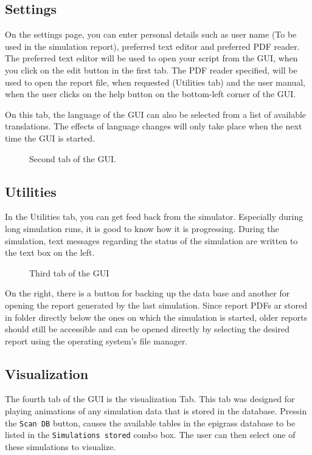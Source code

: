 \subsection{Settings}
On the settings page, you can enter personal details such as user name (To be used in the simulation report), preferred text editor and preferred PDF reader. The preferred text editor will be used to open your script from the GUI, when you click on the edit button in the first tab. The PDF reader specified, will be used to open the report file, when requested (Utilities tab) and the user manual, when the user clicks on the help button on the bottom-left corner of the GUI.

On this tab, the language of the GUI can also be selected from a list of available translations. The effects of language changes will only take place when the next time the GUI is started.
\begin{figure}
	\centering
	\caption{Second tab of the GUI.}
	\label{fig:guiset}
\end{figure}

\subsection{Utilities}
In the Utilities tab, you can get feed back from the simulator. Especially during long simulation runs, it is good to know how it is progressing. During the simulation, text messages regarding the status of the simulation are written to the text box on the left. 
\begin{figure}
	\centering
	\caption{Third tab of the GUI}
	\label{fig:guiout}
\end{figure}

On the right, there is a button for backing up the data base and another for opening the report generated by the last simulation. Since report PDFs ar stored in folder directly below the ones on which the simulation is started, older reports should still be accessible and can be opened directly by selecting the desired report using the operating system's file manager.

\subsection{Visualization}
The fourth tab of the GUI is the visualization Tab. This tab was designed for playing animations of any simulation data that is stored in the database. Pressin the \texttt{Scan DB} button, causes the available tables in the  epigrass database to be listed in the \texttt{Simulations stored} combo box. The user can then select one of these simulations to visualize.

